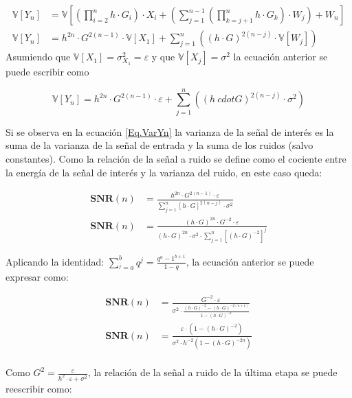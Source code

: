 			\begin{align*}
				\mathbb{V}[Y_n] &= \mathbb{V}\left[ \left(\prod_{i=2}^{n}{h \cdot G_i} \right) \cdot X_i + \left( \sum_{j=1}^{n-1} \left( \prod_{k=j+1}^{n} h \cdot G_k \right) \cdot W_j \right) + W_n \right] \\
				\mathbb{V}[Y_n] &= h^{2n} \cdot G^{2(n-1)} \cdot \mathbb{V}[X_1] + \sum_{j=1}^{n} \left( (h \cdot G)^{2(n-j)} \cdot \mathbb{V}[W_j] \right)
			\end{align*}
\indent Asumiendo que $\mathbb{V}[X_1] = \sigma _{X_1}^2 = \varepsilon$ y que $\mathbb{V}[X_j] = \sigma ^2$ la ecuación anterior se puede escribir como

			\begin{equation}
				\mathbb{V}[Y_n] = h^{2n} \cdot G^{2(n-1)} \cdot \varepsilon + \sum_{j=1}^{n} \left( (h \ cdot G)^{2(n-j)} \cdot \sigma ^2 \right)
				\label{Eq.VarYn}
			\end{equation}
			
\indent Si se observa en la ecuación \ref{Eq.VarYn} la varianza de la señal de interés es la suma de la varianza de la señal de entrada y la suma de los ruidos (salvo constantes). Como la relación de la señal a ruido se define como el cociente entre la energía  de la señal de interés y la varianza del ruido, en este caso queda:
	
			\begin{align*}
			\textbf{SNR}(n) &=\frac{h^{2n} \cdot G^{2(n-1) } \cdot \varepsilon}{\sum_{j=1}^{n} \left[h \cdot G \right] ^{2(n-j)} \cdot \sigma ^2} \\
			\textbf{SNR}(n) &= \frac{\left(h \cdot G \right) ^{2n} \cdot G^{-2} \cdot \varepsilon}{\left(h \cdot G \right) ^{2n} \cdot \sigma ^2 \cdot \sum_{j=1}^{n} \left[ (h \cdot G) ^{-2} \right] ^j }
			\end{align*}
			
\indent Aplicando la identidad: $\sum_{^j=a}^{b}q^j = \frac{q^a - 1^{b+1}}{1 - q}$, la ecuación anterior se puede expresar como:

			\begin{align*}
				\textbf{SNR}(n) &= \frac{G^{-2} \cdot \varepsilon}{\sigma ^2 \cdot \frac{(h \cdot G)^{-2} -(h \cdot G)^{-2(n+1)}}{1-(h \cdot G)^{-2}}} \\
				\textbf{SNR}(n) &= \frac{\varepsilon \cdot (1-(h \cdot G)^{-2})}{\sigma ^2 \cdot h^{-2} (1 - (h \cdot G)^{-2n})}\\
			\end{align*}

\indent Como $G^2 = \frac{\varepsilon}{h^2 \cdot \varepsilon + \sigma ^2}$, la relación de la señal a ruido de la última etapa se puede reescribir como:

